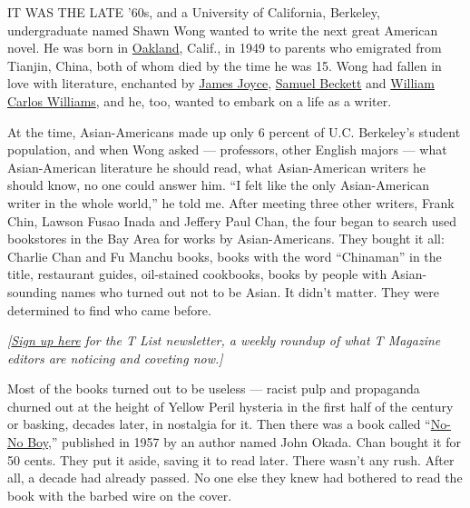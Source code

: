 IT WAS THE LATE '60s, and a University of California, Berkeley,
undergraduate named Shawn Wong wanted to write the next great American
novel. He was born in
\href{https://www.nytimes3xbfgragh.onion/interactive/2015/12/02/travel/what-to-do-in-36-hours-in-oakland-california.html}{Oakland},
Calif., in 1949 to parents who emigrated from Tianjin, China, both of
whom died by the time he was 15. Wong had fallen in love with
literature, enchanted by
\href{https://www.nytimes3xbfgragh.onion/topic/person/james-joyce}{James
Joyce},
\href{https://www.nytimes3xbfgragh.onion/topic/person/samuel-beckett}{Samuel
Beckett} and
\href{https://www.nytimes3xbfgragh.onion/topic/person/william-carlos-williams}{William
Carlos Williams}, and he, too, wanted to embark on a life as a writer.

At the time, Asian-Americans made up only 6 percent of U.C. Berkeley's
student population, and when Wong asked --- professors, other English
majors --- what Asian-American literature he should read, what
Asian-American writers he should know, no one could answer him. ``I felt
like the only Asian-American writer in the whole world,'' he told me.
After meeting three other writers, Frank Chin, Lawson Fusao Inada and
Jeffery Paul Chan, the four began to search used bookstores in the Bay
Area for works by Asian-Americans. They bought it all: Charlie Chan and
Fu Manchu books, books with the word ``Chinaman'' in the title,
restaurant guides, oil-stained cookbooks, books by people with
Asian-sounding names who turned out not to be Asian. It didn't matter.
They were determined to find who came before.

\emph{{[}}\href{https://www.nytimes3xbfgragh.onion/newsletters/t-list?module=inline}{\emph{Sign
up here}} \emph{for the T List newsletter, a weekly roundup of what T
Magazine editors are noticing and coveting now.{]}}

Most of the books turned out to be useless --- racist pulp and
propaganda churned out at the height of Yellow Peril hysteria in the
first half of the century or basking, decades later, in nostalgia for
it. Then there was a book called
``\href{https://uwapress.uw.edu/book/9780295994048/no-no-boy/}{No-No
Boy},'' published in 1957 by an author named John Okada. Chan bought it
for 50 cents. They put it aside, saving it to read later. There wasn't
any rush. After all, a decade had already passed. No one else they knew
had bothered to read the book with the barbed wire on the cover.


